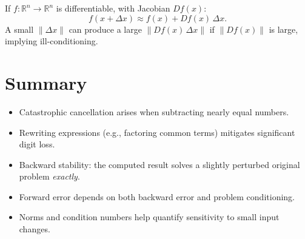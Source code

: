 If \(f:\mathbb{R}^n \to \mathbb{R}^n\) is differentiable, with Jacobian \(Df(x)\):
\[
f(x + \Delta x) \approx f(x) + Df(x)\,\Delta x.
\]
A small \(\|\Delta x\|\) can produce a large \(\|Df(x)\,\Delta x\|\) if \(\|Df(x)\|\) is large, implying ill-conditioning.

\section{Summary}

\begin{itemize}
    \item Catastrophic cancellation arises when subtracting nearly equal numbers.
    \item Rewriting expressions (e.g., factoring common terms) mitigates significant digit loss.
    \item Backward stability: the computed result solves a slightly perturbed original problem \emph{exactly}.
    \item Forward error depends on both backward error and problem conditioning.
    \item Norms and condition numbers help quantify sensitivity to small input changes.
\end{itemize}
